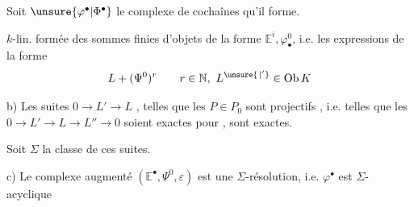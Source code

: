 Soit $\unsure{\varphi^\bullet|\Phi^\bullet}$ le complexe de cochaînes qu'il forme.

 



$k$-lin.  formée des sommes finies d'objets de la forme $\mathbb E^i,\varphi_{\bullet}^{0}$, i.e. les expressions de la forme
\[
L+(\Psi^0)^r\qquad r\in\mathbb N,\ L^{\unsure{\,|'}}\in\operatorname{Ob} K
\]


b) Les suites $0\to L'\to L$   , telles que les $P\in P_0$ sont projectifs , i.e. telles que les $0\to L'\to L\to L''\to0$ soient exactes pour , sont exactes.

 Soit $\Sigma$ la classe de ces suites.

c) Le complexe augmenté $(\mathbb E^\bullet,\Psi^0,\varepsilon)$ est une $\Sigma$-résolution, i.e. $\varphi^\bullet$ est $\Sigma$-acyclique

